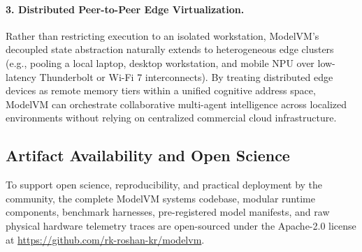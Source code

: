 \paragraph{3. Distributed Peer-to-Peer Edge Virtualization.}
Rather than restricting execution to an isolated workstation, ModelVM's decoupled state abstraction naturally extends to heterogeneous edge clusters (e.g., pooling a local laptop, desktop workstation, and mobile NPU over low-latency Thunderbolt or Wi-Fi 7 interconnects). By treating distributed edge devices as remote memory tiers within a unified cognitive address space, ModelVM can orchestrate collaborative multi-agent intelligence across localized environments without relying on centralized commercial cloud infrastructure.

\subsection{Artifact Availability and Open Science}
\label{sec:open_science}

To support open science, reproducibility, and practical deployment by the community, the complete ModelVM systems codebase, modular runtime components, benchmark harnesses, pre-registered model manifests, and raw physical hardware telemetry traces are open-sourced under the Apache-2.0 license at \url{https://github.com/rk-roshan-kr/modelvm}.
